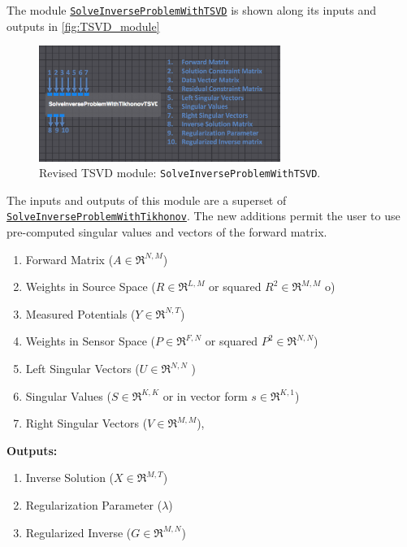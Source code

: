     The module \href{http://scirundocwiki.sci.utah.edu/SCIRunDocs/index.php5/CIBC:Documentation:SCIRun:Reference:BioPSE:SolveInverseProblemWithTSVD}{{\tt SolveInverseProblemWithTSVD}} is shown along its inputs and outputs in \autoref{fig:TSVD_module}
    \begin{figure}
        \begin{center}
        \includegraphics[width=0.7\textwidth]{ECGToolkitGuide_figures/TSVD_module.png}
        \caption{Revised TSVD module: {\tt SolveInverseProblemWithTSVD}.  }
        \label{fig:tik_moduleSVD}
        \end{center}
    \end{figure}
    The inputs and outputs of this module are a superset of \href{http://scirundocwiki.sci.utah.edu/SCIRunDocs/index.php/CIBC:Documentation:SCIRun:Reference:BioPSE:SolveInverseProblemWithTikhonov}{{\tt SolveInverseProblemWithTikhonov}}.
    The new additions permit the user to use pre-computed singular values and vectors of the forward matrix.
    \begin{enumerate}
        \item Forward Matrix ($A\in\Re^{N,M}$)
        \item Weights in Source Space ($R\in\Re^{L,M}$ or squared $R^2\in\Re^{M,M}$ o)
        \item Measured Potentials ($Y\in\Re^{N,T}$)
        \item Weights in Sensor Space ($P\in\Re^{F,N}$ or squared $P^2\in\Re^{N,N}$)
        \item Left Singular Vectors ($U\in\Re^{N,N}$ )
        \item Singular Values ($S\in\Re^{K,K}$ or in vector form $s\in\Re^{K,1}$)
        \item Right Singular Vectors ($V\in\Re^{M,M}$),
    \end{enumerate}
    {\bf Outputs:}
     \begin{enumerate}
        \item Inverse Solution ($X\in\Re^{M,T}$)
        \item Regularization Parameter ($\lambda$)
        \item Regularized Inverse ($G\in\Re^{M,N}$)
    \end{enumerate}
    
